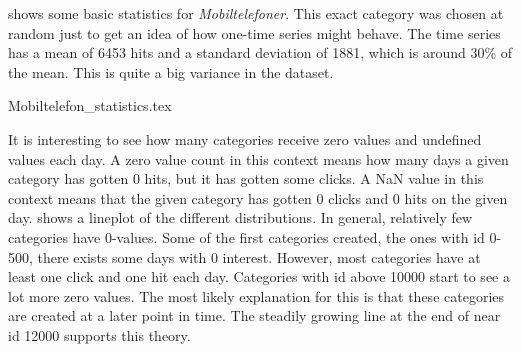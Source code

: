  shows some basic statistics for \textit{Mobiltelefoner}.
This exact category was chosen at random just to get an idea of how one-time series might behave.
The time series has a mean of 6453 hits and a standard deviation of 1881, which is
around 30\% of the mean. This is quite a big variance in the dataset.

{Mobiltelefon_statistics.tex}

It is interesting to see how many categories receive zero values and undefined values each day.
A zero value count in this context means how many days a given category has gotten 0 hits, but it has gotten some clicks.
A NaN value in this context means that the given category has gotten 0 clicks and 0 hits on the given day.
 shows a lineplot of the different distributions.
In general, relatively few categories have 0-values.
Some of the first categories created, the ones with id 0-500, there exists some days with 0 interest.
However, most categories have at least one click and one hit each day.
Categories with id above 10000 start to see a lot more zero values.
The most likely explanation for this is that these categories are created at a later point in time.
The steadily growing line at the end of  near id 12000 supports this theory.

